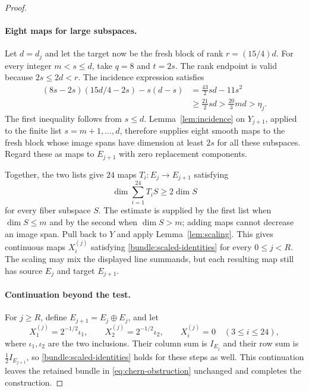 \begin{proof}
\paragraph{Eight maps for large subspaces.}
Let $d=d_j$ and let the target now be the fresh block of rank
$r=(15/4)d$.  For every integer $m<s\leq d$, take $q=8$ and $t=2s$.
The rank endpoint is valid because $2s\leq2d<r$.  The incidence
expression satisfies
\begin{equation}\label{bundle:large-incidence}
 \begin{split}
 (8s-2s)(15d/4-2s)-s(d-s)
 &=\frac{43}{2}sd-11s^2\\
 &\geq\frac{21}{2}sd
 >\frac{20}{3}md
 >\eta_j.
 \end{split}
\end{equation}
The first inequality follows from $s\leq d$.  Lemma~\ref{lem:incidence} on $Y_{j+1}$, applied to the finite
list $s=m+1,\ldots,d$, therefore supplies eight smooth maps to the fresh
block whose image spans have dimension at least $2s$ for all these
subspaces.  Regard these as maps to $E_{j+1}$ with zero replacement
components.

Together, the two lists give $24$ maps $T_i:E_j\to E_{j+1}$ satisfying
\[
 \dim\sum_{i=1}^{24}T_iS\geq2\dim S
\]
for every fiber subspace $S$.  The estimate is supplied by the first
list when $\dim S\leq m$ and by the second when $\dim S>m$; adding maps
cannot decrease an image span.  Pull back to $Y$ and apply
Lemma~\ref{lem:scaling}.  This gives continuous maps $X_i^{(j)}$
satisfying \eqref{bundle:scaled-identities} for every $0\leq j<R$.
The scaling may mix the displayed line summands, but each resulting
map still has source $E_j$ and target $E_{j+1}$.

\paragraph{Continuation beyond the test.}
For $j\geq R$, define $E_{j+1}=E_j\oplus E_j$, and let
\[
 X_1^{(j)}=2^{-1/2}\iota_1,\qquad
 X_2^{(j)}=2^{-1/2}\iota_2,\qquad
 X_i^{(j)}=0\quad(3\leq i\leq24),
\]
where $\iota_1,\iota_2$ are the two inclusions.  Their column sum is
$I_{E_j}$ and their row sum is $\tfrac12I_{E_{j+1}}$, so
\eqref{bundle:scaled-identities} holds for these steps as well.
This continuation leaves the retained bundle in
\eqref{eq:chern-obstruction} unchanged and completes the construction.
\end{proof}
